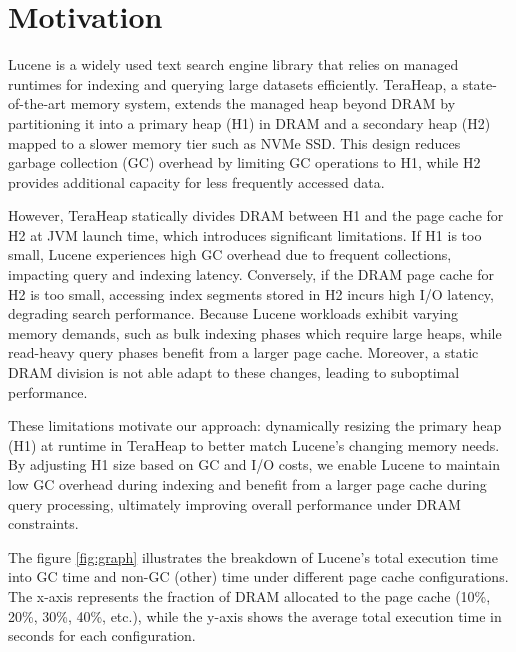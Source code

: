 \section{Motivation}
Lucene is a widely used text search engine library that relies on managed runtimes for indexing and querying large datasets efficiently. TeraHeap, a state-of-the-art memory system, extends the managed heap beyond DRAM by partitioning it into a primary heap (H1) in DRAM and a secondary heap (H2) mapped to a slower memory tier such as NVMe SSD. This design reduces garbage collection (GC) overhead by limiting GC operations to H1, while H2 provides additional capacity for less frequently accessed data.

However, TeraHeap statically divides DRAM between H1 and the page cache for H2 at JVM launch time, which introduces significant limitations. If H1 is too small, Lucene experiences high GC overhead due to frequent collections, impacting query and indexing latency. Conversely, if the DRAM page cache for H2 is too small, accessing index segments stored in H2 incurs high I/O latency, degrading search performance. Because Lucene workloads exhibit varying memory demands, such as bulk indexing phases which require large heaps, while read-heavy query phases benefit from a larger page cache. Moreover, a static DRAM division is not able adapt to these changes, leading to suboptimal performance.

These limitations motivate our approach: dynamically resizing the primary heap (H1) at runtime in TeraHeap to better match Lucene’s changing memory needs. By adjusting H1 size based on GC and I/O costs, we enable Lucene to maintain low GC overhead during indexing and benefit from a larger page cache during query processing, ultimately improving overall performance under DRAM constraints.

The figure \ref{fig:graph} illustrates the breakdown of Lucene’s total execution time into GC time and non-GC (other) time under different page cache configurations. The x-axis represents the fraction of DRAM allocated to the page cache (10\%, 20\%, 30\%, 40\%, etc.), while the y-axis shows the average total execution time in seconds for each configuration.

